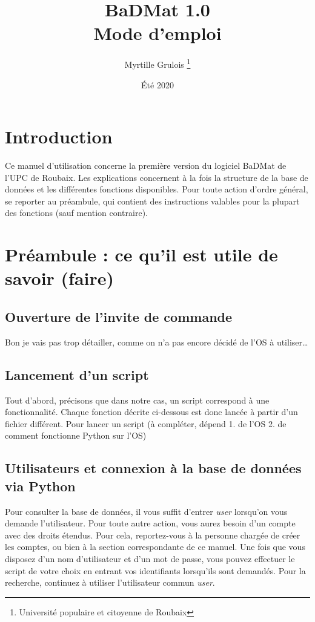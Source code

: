 \documentclass[12pt,a4paper]{article}
\title{\Huge BaDMat 1.0 \\ \LARGE Mode d'emploi} %
\author{Myrtille Grulois \thanks{Université populaire et citoyenne de Roubaix}}
\date{Été 2020}
\begin{document}
\begin{titlepage}
    \maketitle
\end{titlepage}

\tableofcontents
\clearpage

\section*{Introduction}

    Ce manuel d'utilisation concerne la première version du logiciel BaDMat de l'UPC de Roubaix.
    Les explications concernent à la fois la structure de la base de données et les différentes fonctions disponibles.
    Pour toute action d'ordre général, se reporter au préambule, qui contient des instructions valables pour la plupart des fonctions (sauf mention contraire).

\bigskip
\section{Préambule : ce qu'il est utile de savoir (faire)}
    
    \subsection{Ouverture de l'invite de commande}
    
        Bon je vais pas trop détailler, comme on n'a pas encore décidé de l'OS à utiliser\dots
    
    
    \bigskip
    \subsection{Lancement d'un script}
        Tout d'abord, précisons que dans notre cas, un script correspond à une fonctionnalité.
        Chaque fonction décrite ci-dessous est donc lancée à partir d'un fichier différent.
        Pour lancer un script (à compléter, dépend 1. de l'OS 2. de comment fonctionne Python sur l'OS)
    
    \bigskip
    \subsection{Utilisateurs et connexion à la base de données via Python}
        Pour consulter la base de données, il vous suffit d'entrer \emph{user} lorsqu'on vous demande l'utilisateur.
        Pour toute autre action, vous aurez besoin d'un compte avec des droits étendus.
        Pour cela, reportez-vous à la personne chargée de créer les comptes, ou bien à la section correspondante de ce manuel.
        Une fois que vous disposez d'un nom d'utilisateur et d'un mot de passe, vous pouvez effectuer le script de
        votre choix en entrant vos identifiants lorsqu'ils sont demandés. Pour la recherche, continuez à utiliser l'utilisateur commun \emph{user}.
    
\end{document}
